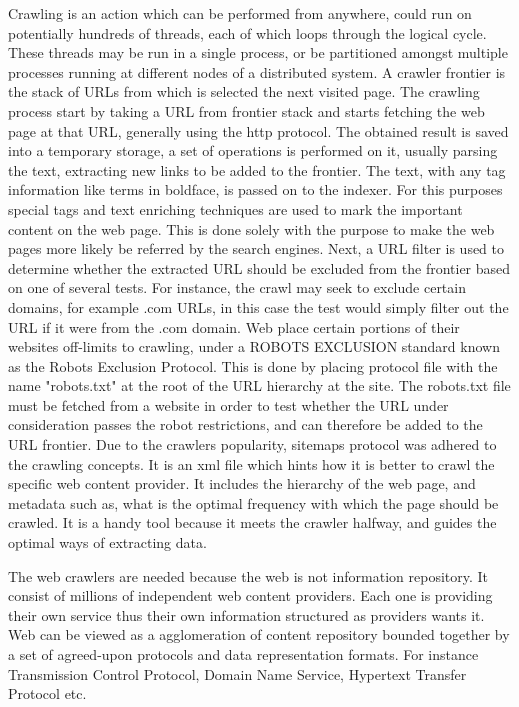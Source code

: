 Crawling is an action which can be performed from anywhere, could run on potentially hundreds of threads, each of which loops through the logical cycle. These threads may be run in a single process, or be partitioned amongst multiple processes running at different nodes of a distributed system. A crawler frontier is the stack of URLs from which is selected the next visited page. The crawling process start by taking a URL from frontier stack and starts fetching the web page at that URL, generally using the http protocol. The obtained result is saved into a temporary storage, a set of operations is performed on it, usually parsing the text, extracting new links to be added to the frontier. The text, with any tag information like terms in
boldface, is passed on to the indexer. For this purposes special tags and text enriching techniques are used to mark the important content on the web page. This is done solely with the purpose to make the web pages more likely be referred by the search engines. Next, a URL filter is used to determine whether the extracted URL should be excluded from the frontier based on one of several tests. For instance, the crawl may seek to exclude certain domains, for example .com  URLs, in this case the test would simply filter out the URL if it were from the .com domain. Web place certain portions of their websites off-limits to crawling, under a ROBOTS EXCLUSION standard known as the Robots Exclusion Protocol. This is done by placing protocol file with the name "robots.txt" at the root of the URL hierarchy at the site. The robots.txt file must be fetched from a website in order to test whether the URL under consideration passes the robot restrictions, and can therefore be added to the URL frontier. Due to the crawlers popularity, sitemaps protocol was adhered to the crawling concepts. It is an xml file which hints how it is better to crawl the specific web content provider. It includes the hierarchy of the web page, and metadata such as, what is the optimal frequency with which the page should be crawled. It is a handy tool because it meets the crawler halfway, and guides the optimal ways of extracting data.

The web crawlers are needed because the web is not information repository. It consist of millions of independent web content providers. Each one is providing their own service thus their own information structured as providers wants it. Web can be viewed as a agglomeration of content repository bounded together by a set of agreed-upon protocols and data representation formats. For instance Transmission Control Protocol, Domain Name Service, Hypertext Transfer Protocol etc.

